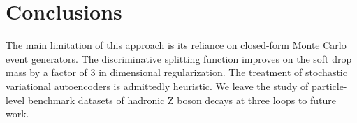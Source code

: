 \section{Conclusions}\label{sec:conclusions}

The main limitation of this approach is its reliance on closed-form
Monte Carlo event generators. The discriminative splitting function
improves on the soft drop mass by a factor of 3 in dimensional
regularization. The treatment of stochastic variational autoencoders is
admittedly heuristic. We leave the study of particle-level benchmark
datasets of hadronic Z boson decays at three loops to future work.


